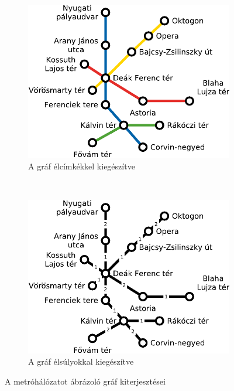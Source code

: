 \begin{figure}[H]
	\begin{subfigure}[b]{0.5\textwidth}
		\includegraphics[width=\textwidth]{metrohalozat-nagykorut-elcimkezett}
		\caption{A gráf élcímkékkel kiegészítve}
		\label{fig:metrohalozat-nagykorut-elcimkezett}
	\end{subfigure}
	~
	\begin{subfigure}[b]{0.5\textwidth}
		\includegraphics[width=\textwidth]{metrohalozat-nagykorut-elsulyozott}
		\caption{A gráf élsúlyokkal kiegészítve}
		\label{fig:metrohalozat-nagykorut-elsulyozott}
	\end{subfigure}
	\caption{A metróhálózatot ábrázoló gráf kiterjesztései}\label{fig:animals}
\end{figure}

